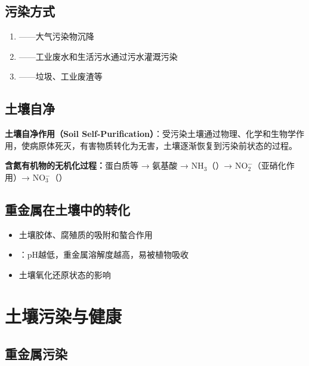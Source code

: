 \subsection{污染方式}

\begin{enumerate}[leftmargin=*]
    \item {}——大气污染物沉降
    \item {}——工业废水和生活污水通过污水灌溉污染
    \item {}——垃圾、工业废渣等
\end{enumerate}

\subsection{土壤自净}

\begin{defbox}
\textbf{土壤自净作用（Soil Self-Purification）}：受污染土壤通过物理、化学和生物学作用，使病原体死灭，有害物质转化为无害，土壤逐渐恢复到污染前状态的过程。
\end{defbox}

\textbf{含氮有机物的无机化过程：}蛋白质等 → 氨基酸 → NH$_3$（）→ NO$_2^-$（亚硝化作用）→ NO$_3^-$（）

\subsection{重金属在土壤中的转化}

\begin{itemize}[leftmargin=*]
    \item 土壤胶体、腐殖质的吸附和螯合作用
    \item {}：pH越低，重金属溶解度越高，易被植物吸收
    \item 土壤氧化还原状态的影响
\end{itemize}

\section{土壤污染与健康}

\subsection{重金属污染}

